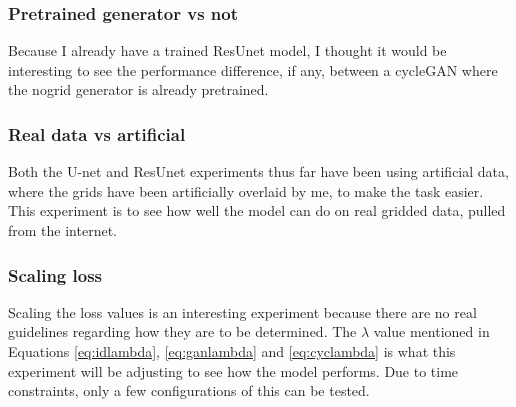 \subsubsection{Pretrained generator vs not}
Because I already have a trained ResUnet model, I thought it would be interesting to see the performance difference, if any, between a cycleGAN where the nogrid generator is already pretrained.
\subsubsection{Real data vs artificial}
Both the U-net and ResUnet experiments thus far have been using artificial data, where the grids have been artificially overlaid by me, to make the task easier. This experiment is to see how well the model can do on real gridded data, pulled from the internet.
\subsubsection{Scaling loss}
Scaling the loss values is an interesting experiment because there are no real guidelines regarding how they are to be determined. The $\lambda$ value mentioned in Equations \ref{eq:idlambda}, \ref{eq:ganlambda} and \ref{eq:cyclambda} is what this experiment will be adjusting to see how the model performs. Due to time constraints, only a few configurations of this can be tested.
